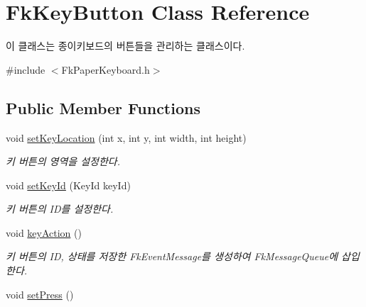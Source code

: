 \hypertarget{class_fk_key_button}{}\section{Fk\+Key\+Button Class Reference}
\label{class_fk_key_button}


이 클래스는 종이키보드의 버튼들을 관리하는 클래스이다.  




{\ttfamily \#include $<$Fk\+Paper\+Keyboard.\+h$>$}

\subsection*{Public Member Functions}
\begin{DoxyCompactItemize}
\item 
\hypertarget{class_fk_key_button_a6990a61855387697507bdaf40f401377}{}void \hyperlink{class_fk_key_button_a6990a61855387697507bdaf40f401377}{set\+Key\+Location} (int x, int y, int width, int height)\label{class_fk_key_button_a6990a61855387697507bdaf40f401377}

\begin{DoxyCompactList}\small\item\em 키 버튼의 영역을 설정한다. \end{DoxyCompactList}\item 
\hypertarget{class_fk_key_button_ad61aac7536b43e241d42f9505381441d}{}void \hyperlink{class_fk_key_button_ad61aac7536b43e241d42f9505381441d}{set\+Key\+Id} (Key\+Id key\+Id)\label{class_fk_key_button_ad61aac7536b43e241d42f9505381441d}

\begin{DoxyCompactList}\small\item\em 키 버튼의 I\+D를 설정한다. \end{DoxyCompactList}\item 
\hypertarget{class_fk_key_button_aa5b53ceb47d758db04e8029a8d920f94}{}void \hyperlink{class_fk_key_button_aa5b53ceb47d758db04e8029a8d920f94}{key\+Action} ()\label{class_fk_key_button_aa5b53ceb47d758db04e8029a8d920f94}

\begin{DoxyCompactList}\small\item\em 키 버튼의 I\+D, 상태를 저장한 Fk\+Event\+Message를 생성하여 Fk\+Message\+Queue에 삽입한다. \end{DoxyCompactList}\item 
\hypertarget{class_fk_key_button_a4276d2c5f49ccfbe56541058d6e29f75}{}void \hyperlink{class_fk_key_button_a4276d2c5f49ccfbe56541058d6e29f75}{set\+Press} ()\label{class_fk_key_button_a4276d2c5f49ccfbe56541058d6e29f75}


\end{DoxyCompactItemize}
